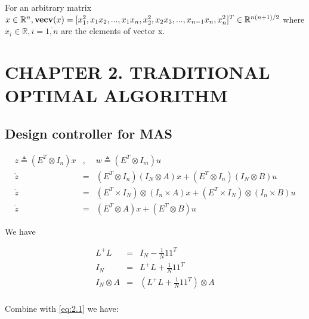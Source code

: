 \documentclass{article}
\begin{document}
    For an arbitrary matrix \(x \in \mathbb{R}^{n}, \textbf{vecv}(x) = [x_{1}^{2},x_{1}x_{2},...,x_{1}x_{n},x_{2}^{2},x_{2}x_{3},...,x_{n-1}x_{n},x_{n}^{2}]^{T} \\ \in \mathbb{R}^{n(n+1)/2}\) where \(x_{i} \in \mathbb{R},i= \overline{1,n}\) are the elements of vector x.


    \newpage
    
    \section*{CHAPTER 2. TRADITIONAL OPTIMAL ALGORITHM}

    \setcounter{section}{2}
    \setcounter{subsection}{0}

    \subsection{Design controller for MAS}

    \begin{equation}
        \begin{array}{rcl}
             z \triangleq (E^T \otimes I_n)x & , & w \triangleq (E^T \otimes I_m)u \\
             \dot{z} & = & (E^T \otimes I_n)(I_N \otimes A)x + (E^T \otimes I_n)(I_N \otimes B)u \\ 
             \dot{z} & = & (E^T \times I_N)\otimes(I_n \times A)x + (E^T \times I_N)\otimes(I_n \times B)u \\
             \dot{z} & = & (E^T \otimes A)x + (E^T \otimes B)u
        \end{array}
        \label{eq:2.1}
    \end{equation}

    We have

    \begin{equation}
        \begin{array}{rcl}
             L^{+}L & = & I_N - \frac{1}{N}11^T \\
             I_N & = & L^{+}L + \frac{1}{N}11^T \\
             I_N \otimes A & = & (L^{+}L + \frac{1}{N}11^T) \otimes A \\
        \end{array}
    \end{equation}

    Combine with \eqref{eq:2.1} we have:
    \begin{equation}
        \begin{array}{rcl}
             & &  \\
             & 
        \end{array}
    \end{equation}
\end{document}
